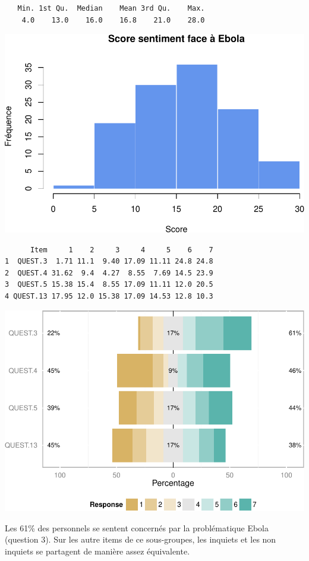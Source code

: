 \documentclass[]{article}
\begin{document}
\begin{verbatim}
   Min. 1st Qu.  Median    Mean 3rd Qu.    Max. 
    4.0    13.0    16.0    16.8    21.0    28.0 
\end{verbatim}

\includegraphics{analyse_files/figure-latex/unnamed-chunk-20-1.pdf}

\begin{verbatim}
      Item     1    2     3     4     5    6    7
1  QUEST.3  1.71 11.1  9.40 17.09 11.11 24.8 24.8
2  QUEST.4 31.62  9.4  4.27  8.55  7.69 14.5 23.9
3  QUEST.5 15.38 15.4  8.55 17.09 11.11 12.0 20.5
4 QUEST.13 17.95 12.0 15.38 17.09 14.53 12.8 10.3
\end{verbatim}

\includegraphics{analyse_files/figure-latex/unnamed-chunk-20-2.pdf}

Les 61\% des personnels se sentent concernés par la problématique Ebola
(question 3). Sur les autre items de ce sous-groupes, les inquiets et
les non inquiets se partagent de manière assez équivalente.
\end{document}
